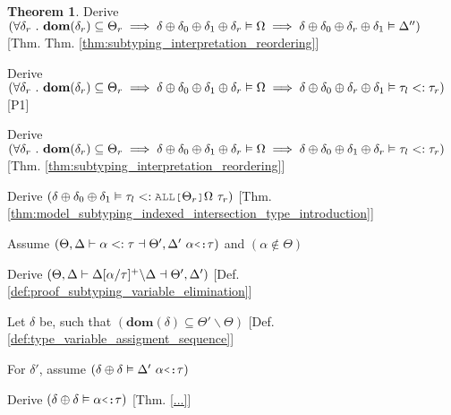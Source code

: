\documentclass[acmsmall]{acmart}
\theoremstyle{definition}
\newtheorem{theorem}{Theorem}[section]
\begin{document}
\begin{theorem}
  \item \I\I \N Derive $(
    \forall \delta_r \ .\ 
    \textbf{dom}(\delta_r) \subseteq \Theta_r
    \implies
    \delta \oplus \delta_0 \oplus \delta_1 \oplus \delta_r \vDash \Omega
    \implies
    \delta \oplus \delta_0 \oplus \delta_r \oplus \delta_1 \vDash \Delta''
  )$ [Thm. Thm. \ref{thm:subtyping_interpretation_reordering}]

  \item \I\I \N Derive $(
    \forall \delta_r \ .\ 
    \textbf{dom}(\delta_r) \subseteq \Theta_r
    \implies
    \delta \oplus \delta_0 \oplus \delta_1 \oplus \delta_r \vDash \Omega
    \implies
    \delta \oplus \delta_0 \oplus \delta_r \oplus \delta_1 \vDash \tau_l <: \tau_r
  )$ [P1] 

  \item \I\I \N Derive $(
    \forall \delta_r \ .\ 
    \textbf{dom}(\delta_r) \subseteq \Theta_r
    \implies
    \delta \oplus \delta_0 \oplus \delta_1 \oplus \delta_r \vDash \Omega
    \implies
    \delta \oplus \delta_0 \oplus \delta_1 \oplus \delta_r \vDash \tau_l <: \tau_r
  )$ [Thm. \ref{thm:subtyping_interpretation_reordering}]

  \item \I\I \N Derive $(
    \delta \oplus \delta_0 \oplus \delta_1 \satisfies \tau_l \subtypes \J{ALL[} \Theta_r \J{]} \Omega\ \tau_r
  )$ [Thm. \ref{thm:model_subtyping_indexed_intersection_type_introduction}]


  \item \N Assume $(
    \Theta, \Delta \entails \alpha \subtypes \tau \given \Theta', \Delta'\ \alpha\J{<:}\tau
  )$ and $(
    \alpha \notin \Theta
  )$
  \item \I \N Derive $(
    \Theta, \Delta \vdash \Delta[\alpha\slash\tau]^{+} \backslash \Delta \dashv \Theta', \Delta'
  )$ [Def. \ref{def:proof_subtyping_variable_elimination}]

  \item \I \N Let $\delta$ be, such that $(
    \textbf{dom}(\delta) \subseteq \Theta' \backslash \Theta
  )$ [Def. \ref{def:type_variable_assigment_sequence}]

  \item \I \N For $\delta'$, assume $(
    \delta \oplus \delta \satisfies \Delta'\ \alpha \J{<:} \tau
  )$ 
  \item \I\I \N Derive $(
    \delta \oplus \delta \satisfies \alpha \J{<:} \tau
  )$ [Thm. \ref{...}]


\end{theorem}
\end{document}
